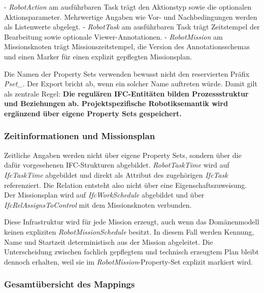 - \textit{RobotAction} am ausführbaren Task trägt den Aktionstyp sowie die optionalen Aktionsparameter. Mehrwertige Angaben wie Vor- und Nachbedingungen werden als Listenwerte abgelegt.
- \textit{RobotTask} am ausführbaren Task trägt Zeitstempel der Bearbeitung sowie optionale Viewer-Annotationen.
- \textit{RobotMission} am Missionsknoten trägt Missionszeitstempel, die Version des Annotationsschemas und einen Marker für einen explizit gepflegten Missionsplan.

Die Namen der Property Sets verwenden bewusst nicht den reservierten Präfix \textit{Pset\_}. Der
Export bricht ab, wenn ein solcher Name auftreten würde. Damit gilt als zentrale Regel:
\textbf{Die regulären IFC-Entitäten bilden Prozessstruktur und Beziehungen ab. Projektspezifische
Robotiksemantik wird ergänzend über eigene Property Sets gespeichert.}

\subsubsection{Zeitinformationen und Missionsplan}

Zeitliche Angaben werden nicht über eigene Property Sets, sondern über die dafür vorgesehenen
IFC-Strukturen abgebildet. \textit{RobotTaskTime} wird auf \textit{IfcTaskTime} abgebildet und
direkt als Attribut des zugehörigen \textit{IfcTask} referenziert. Die Relation entsteht also nicht
über eine Eigenschaftszuweisung. Der Missionsplan wird auf \textit{IfcWorkSchedule} abgebildet und
über \textit{IfcRelAssignsToControl} mit dem Missionsknoten verbunden.

Diese Infrastruktur wird für jede Mission erzeugt, auch wenn das Domänenmodell keinen expliziten
\textit{RobotMissionSchedule} besitzt. In diesem Fall werden Kennung, Name und Startzeit
deterministisch aus der Mission abgeleitet. Die Unterscheidung zwischen fachlich gepflegtem und
technisch erzeugtem Plan bleibt dennoch erhalten, weil sie im \textit{RobotMission}-Property-Set
explizit markiert wird.

\subsubsection{Gesamtübersicht des Mappings}


